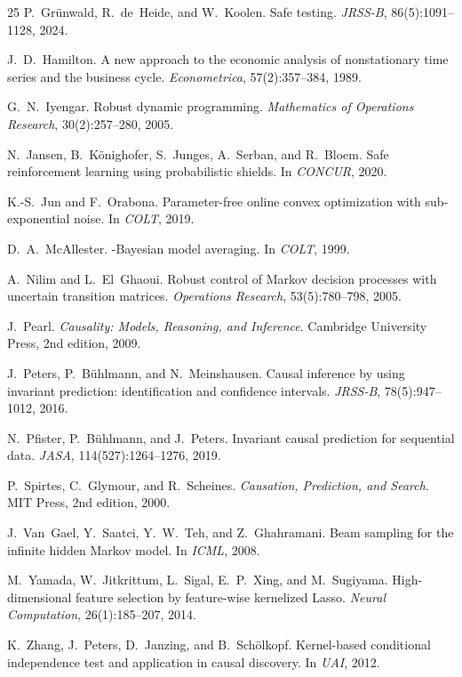 \documentclass[11pt]{article}
\begin{document}
\begin{thebibliography}{25}
P.~Gr\"unwald, R.~de~Heide, and W.~Koolen.
\newblock Safe testing.
\newblock \emph{JRSS-B}, 86(5):1091--1128, 2024.

J.~D.~Hamilton.
\newblock A new approach to the economic analysis of nonstationary time
series and the business cycle.
\newblock \emph{Econometrica}, 57(2):357--384, 1989.

G.~N.~Iyengar.
\newblock Robust dynamic programming.
\newblock \emph{Mathematics of Operations Research}, 30(2):257--280, 2005.

N.~Jansen, B.~K\"onighofer, S.~Junges, A.~Serban, and R.~Bloem.
\newblock Safe reinforcement learning using probabilistic shields.
\newblock In \emph{CONCUR}, 2020.

K.-S.~Jun and F.~Orabona.
\newblock Parameter-free online convex optimization with sub-exponential
noise.
\newblock In \emph{COLT}, 2019.

D.~A.~McAllester.
-{B}ayesian model averaging.
\newblock In \emph{COLT}, 1999.

A.~Nilim and L.~El~Ghaoui.
\newblock Robust control of {M}arkov decision processes with uncertain
transition matrices.
\newblock \emph{Operations Research}, 53(5):780--798, 2005.

J.~Pearl.
\newblock \emph{Causality: Models, Reasoning, and Inference}.
\newblock Cambridge University Press, 2nd edition, 2009.

J.~Peters, P.~B\"uhlmann, and N.~Meinshausen.
\newblock Causal inference by using invariant prediction: identification
and confidence intervals.
\newblock \emph{JRSS-B}, 78(5):947--1012, 2016.

N.~Pfister, P.~B\"uhlmann, and J.~Peters.
\newblock Invariant causal prediction for sequential data.
\newblock \emph{JASA}, 114(527):1264--1276, 2019.

P.~Spirtes, C.~Glymour, and R.~Scheines.
\newblock \emph{Causation, Prediction, and Search}.
\newblock MIT Press, 2nd edition, 2000.

J.~Van~Gael, Y.~Saatci, Y.~W.~Teh, and Z.~Ghahramani.
\newblock Beam sampling for the infinite hidden {M}arkov model.
\newblock In \emph{ICML}, 2008.

M.~Yamada, W.~Jitkrittum, L.~Sigal, E.~P.~Xing, and M.~Sugiyama.
\newblock High-dimensional feature selection by feature-wise kernelized
{L}asso.
\newblock \emph{Neural Computation}, 26(1):185--207, 2014.

K.~Zhang, J.~Peters, D.~Janzing, and B.~Sch\"olkopf.
\newblock Kernel-based conditional independence test and application in
causal discovery.
\newblock In \emph{UAI}, 2012.

\end{thebibliography}
\end{document}
